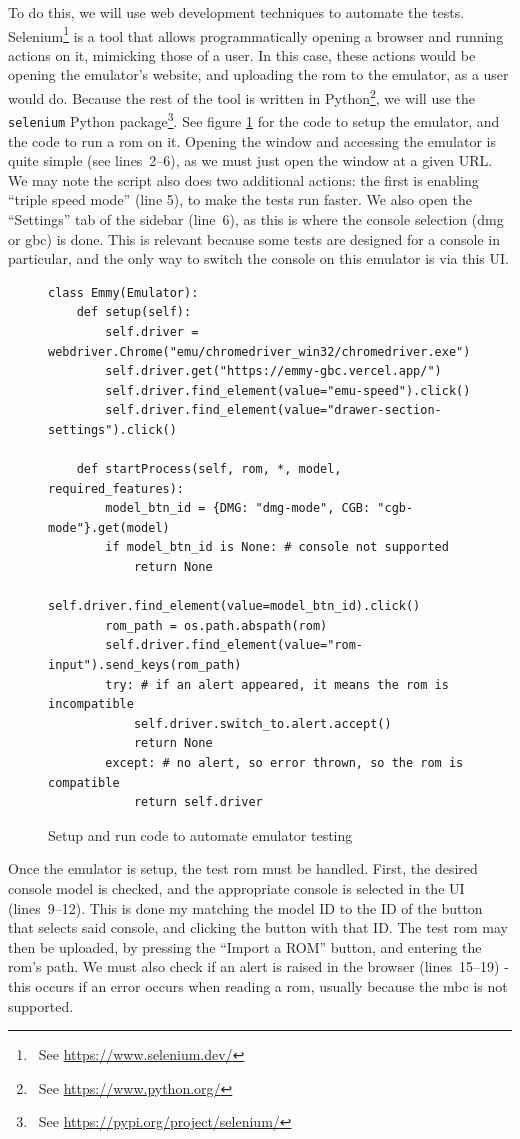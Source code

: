 \documentclass[11pt]{informatics-report}
\newcommand{\ftnt}[1]{\footnote{~See \url{#1}}}
\begin{document}
To do this, we will use web development techniques to automate the tests. Selenium\ftnt{https://www.selenium.dev/} is a tool that allows programmatically opening a browser and running actions on it, mimicking those of a user. In this case, these actions would be opening the emulator's website, and uploading the \gls{rom} to the emulator, as a user would do. Because the rest of the tool is written in Python\ftnt{https://www.python.org/}, we will use the \texttt{selenium} Python package\ftnt{https://pypi.org/project/selenium/}. See figure \ref{fig:selenium-testing} for the code to setup the emulator, and the code to run a \gls{rom} on it. Opening the window and accessing the emulator is quite simple (see lines~2--6), as we must just open the window at a given URL. We may note the script also does two additional actions: the first is enabling ``triple speed mode'' (line 5), to make the tests run faster. We also open the ``Settings'' tab of the sidebar (line~6), as this is where the console selection (\gls{dmg} or \gls{gbc}) is done. This is relevant because some tests are designed for a console in particular, and the only way to switch the console on this emulator is via this UI.

\begin{figure}[h]
    \begin{verbatim}
class Emmy(Emulator):
    def setup(self):
        self.driver = webdriver.Chrome("emu/chromedriver_win32/chromedriver.exe")
        self.driver.get("https://emmy-gbc.vercel.app/")
        self.driver.find_element(value="emu-speed").click()
        self.driver.find_element(value="drawer-section-settings").click()

    def startProcess(self, rom, *, model, required_features):
        model_btn_id = {DMG: "dmg-mode", CGB: "cgb-mode"}.get(model)
        if model_btn_id is None: # console not supported
            return None
        self.driver.find_element(value=model_btn_id).click()
        rom_path = os.path.abspath(rom)
        self.driver.find_element(value="rom-input").send_keys(rom_path)
        try: # if an alert appeared, it means the rom is incompatible
            self.driver.switch_to.alert.accept()
            return None
        except: # no alert, so error thrown, so the rom is compatible
            return self.driver
    \end{verbatim}
    \caption{Setup and run code to automate emulator testing}
    \label{fig:selenium-testing}
\end{figure}

Once the emulator is setup, the test \gls{rom} must be handled. First, the desired console model is checked, and the appropriate console is selected in the UI (lines~9--12). This is done my matching the model ID to the ID of the button that selects said console, and clicking the button with that ID. The test \gls{rom} may then be uploaded, by pressing the ``Import a ROM'' button, and entering the \gls{rom}'s path. We must also check if an alert is raised in the browser (lines~15--19) - this occurs if an error occurs when reading a \gls{rom}, usually because the \gls{mbc} is not supported.
\end{document}
